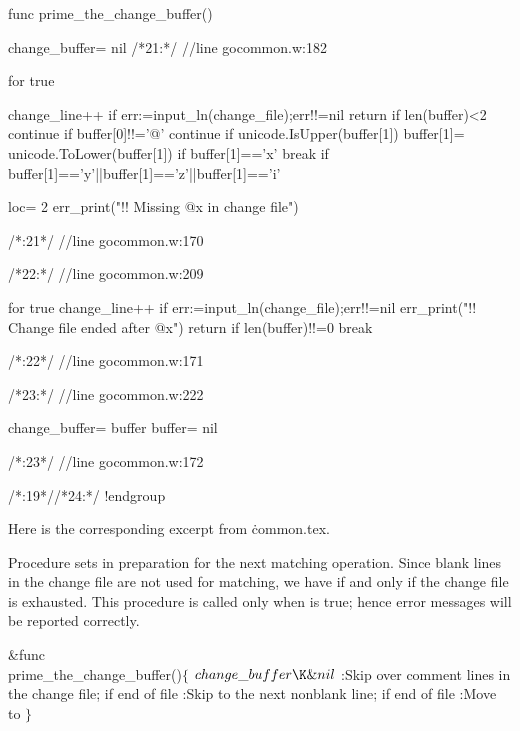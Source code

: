 func prime_the_change_buffer(){
change_buffer= nil
/*21:*/
//line gocommon.w:182

for true{
change_line++
if err:=input_ln(change_file);err!!=nil{
return
}
if len(buffer)<2{
continue
}
if buffer[0]!!='@'{
continue
}
if unicode.IsUpper(buffer[1]){
buffer[1]= unicode.ToLower(buffer[1])
}
if buffer[1]=='x'{
break
}
if buffer[1]=='y'||buffer[1]=='z'||buffer[1]=='i'{
loc= 2
err_print("!! Missing @x in change file")

}
}

/*:21*/
//line gocommon.w:170

/*22:*/
//line gocommon.w:209

for true{
change_line++
if err:=input_ln(change_file);err!!=nil{
err_print("!! Change file ended after @x")
return
}
if len(buffer)!!=0{
break
}
}

/*:22*/
//line gocommon.w:171

/*23:*/
//line gocommon.w:222

{
change_buffer= buffer
buffer= nil
}

/*:23*/
//line gocommon.w:172

}

/*:19*//*24:*/
!endgroup
\endgroup
\vfill\eject

\def\runninghead{APPENDIX A --- TRANSLATION BY {\tentt GOWEAVE}}

Here is the corresponding excerpt from \.{common.tex}.

\vskip6pt
\begingroup \def\tt{\eighttt} \baselineskip9pt
\verbatim

Procedure 
sets  in preparation for the next matching operation.
Since blank lines in the change file are not used for matching, we have
 if and only if
the change file is exhausted. This procedure is called only when
 is true; hence error messages will be reported correctly.

\Y\B\&{func}\5
\\{prime\_the\_change\_buffer}()${}\{{}$\1\6
${}\\{change\_buffer}\K\&{nil}{}$\6
:Skip over comment lines in the change file;  if end of file%
\X\6
:Skip to the next nonblank line;  if end of file\X\6
:Move  to \X\2\6
${}\}{}$\Y\par
\fi

